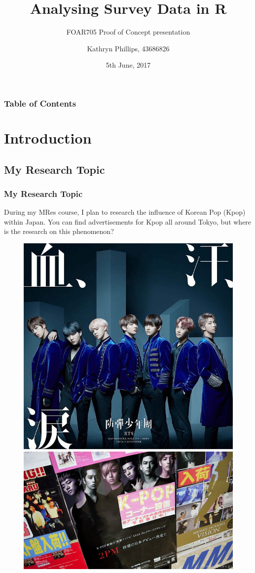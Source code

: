 \documentclass[aspectratio=1610]{beamer}
\title{Analysing Survey Data in R}
\subtitle{FOAR705 Proof of Concept presentation}
\author{Kathryn Phillips, 43686826}
\institute{Department of International Studies}
\date{5th June, 2017}
\begin{document}
\begin{frame}
\frame{\titlepage}
\end{frame}
\begin{frame}
\frametitle{Table of Contents}
\tableofcontents
\end{frame}
\section{Introduction}
\subsection{My Research Topic}
\begin{frame}
\frametitle{My Research Topic}
During my MRes course, I plan to research the influence of Korean Pop (Kpop) within Japan.
\newline
You can find advertisements for Kpop all around Tokyo, but where is the research on this phenomenon?
\newline
\begin{figure}[h]
\includegraphics[scale=0.2]{bts}
\includegraphics[scale=0.6]{kpopexample}
\end{figure}
\end{frame}
\end{document}
